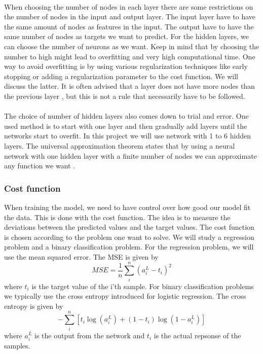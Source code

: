 \\
When choosing the number of nodes in each layer there are some restrictions on the number of nodes in the input and output layer. The input layer have to have the same amount of nodes as features in the input. The output have to have the same number of nodes as targets we want to predict. For the hidden layers, we can choose the number of neurons as we want. Keep in mind that by choosing the number to high might lead to overfitting and very high computational time. One way to avoid overfitting is by using various regularization techniques like early stopping or adding a regularization parameter to the cost function. We will discuss the latter. It is often advised that a layer does not have more nodes than the previous layer \cite{Hands-On}, but this is not a rule that necessarily have to be followed. 
\\
\\
The choice of number of hidden layers also comes down to trial and error. One used method is to start with one layer and then gradually add layers until the networks start to overfit. In this project we will use network with 1 to 6 hidden layers. The universal approximation theorem states that by using a neural network with one hidden layer with a finite number of nodes we can approximate any function we want \cite{Hands-On}. 
\subsubsection{Cost function}
When training the model, we need to have control over how good our model fit the data. This is done with the cost function. The idea is to measure the deviations between the predicted values and the target values. 
The cost function is chosen according to the problem one want to solve.
We will study a regression problem and a binary classification problem. For the regression problem, we will use the mean squared error. The MSE is given by 
\begin{equation}
    MSE = \frac{1}{n}\sum_i^n (a^L_i - t_i)^2
\end{equation}
where $t_i$ is the target value of the i'th sample. For binary classification problems we typically use the cross entropy introduced for logistic regression. The cross entropy is given by 
\begin{equation}
    -\sum_i^n[ t_i\log(a^L_i) + (1-t_i)\log(1-a^L_i)]
\end{equation}
where $a_i^L$ is the output from the network and $t_i$ is the actual repsonse of the samples. 
